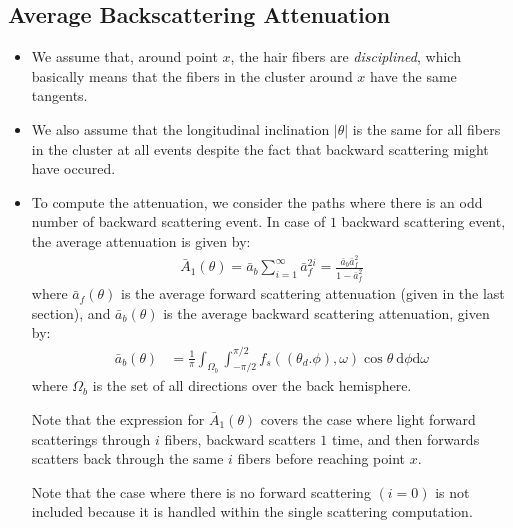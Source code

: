 \documentclass[10pt]{article}
\newcommand{\dee}{\mathrm{d}}
\begin{document}
  \subsection{Average Backscattering Attenuation}
  \begin{itemize}
    \item We assume that, around point $x$, the hair fibers are \emph{disciplined}, which basically means that the fibers in the cluster around $x$ have the same tangents.

    \item We also assume that the longitudinal inclination $|\theta|$ is the same for all fibers in the cluster at all events despite the fact that backward scattering might have occured.

    \item To compute the attenuation, we consider the paths where there is an odd number of backward scattering event.  In case of $1$ backward scattering event, the average attenuation is given by:
    \begin{align*}
      \bar{A}_1(\theta) = \bar{a}_b \sum_{i=1}^\infty \bar{a}_f^{2i} = \frac{\bar{a}_b \bar{a}_f^2}{1 - \bar{a}_f^2}
    \end{align*}
    where $\bar{a}_f(\theta)$ is the average forward scattering attenuation (given in the last section), and $\bar{a}_b(\theta)$ is the average backward scattering attenuation, given by:
    \begin{align*}
      \bar{a}_b(\theta) 
      &= \frac{1}{\pi} \int_{\Omega_b} \int_{-\pi/2}^{\pi/2} f_s((\theta_d. \phi), \omega) \cos \theta\ \dee\phi \dee\omega
    \end{align*}
    where $\Omega_b$ is the set of all directions over the back hemisphere.  

    Note that the expression for $\bar{A}_1(\theta)$ covers the case where light forward scatterings through $i$ fibers, backward scatters $1$ time, and then forwards scatters back through the same $i$ fibers before reaching point $x$.

    Note that the case where there is no forward scattering $(i=0)$ is not included because it is handled within the single scattering computation.


\end{itemize}
\end{document}
